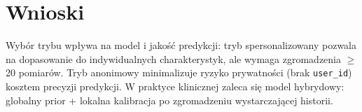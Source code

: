 \documentclass[12pt,a4paper]{article}
\begin{document}
\section{Wnioski}
Wybór trybu wpływa na model i jakość predykcji: tryb spersonalizowany pozwala na dopasowanie do indywidualnych charakterystyk, ale wymaga zgromadzenia $\ge$ 20 pomiarów. Tryb anonimowy minimalizuje ryzyko prywatności (brak \texttt{user\_id}) kosztem precyzji predykcji. W praktyce klinicznej zaleca się model hybrydowy: globalny prior + lokalna kalibracja po zgromadzeniu wystarczającej historii.
\end{document}
